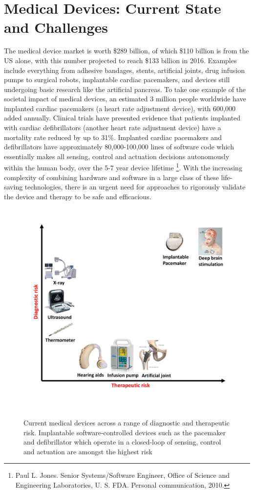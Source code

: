 \chapter{Medical Devices: Current State and Challenges}

The medical device market is worth \$289 billion, of which \$110 billion is from the US alone, with this number projected to reach \$133 billion in 2016.
Examples include everything from adhesive bandages, stents, artificial joints, drug infusion pumps to surgical robots, implantable cardiac pacemakers, and devices still undergoing basic research like the artificial pancreas.
To take one example of the societal impact of medical devices, an estimated 3 million people worldwide have implanted cardiac pacemakers (a heart rate adjustment device), with 600,000 added annually.
Clinical trials have presented evidence that patients implanted with cardiac defibrillators (another heart rate adjustment device) have a mortality rate reduced by up to 31\%.
Implanted cardiac pacemakers and defibrillators have approximately 80,000-100,000 lines of software code which essentially makes all sensing, control and actuation decisions autonomously within the human body, over the 5-7 year device lifetime \footnote{Paul L. Jones. Senior Systems/Software Engineer, Office of Science and Engineering
Laboratories, U. S. FDA. Personal communication, 2010.}. With the increasing complexity of combining hardware and software in a large class of these life-saving technologies, there is an urgent need for approaches to rigorously validate the device and therapy to be safe and efficacious.
\begin{figure}[t]
		\centering
		\includegraphics[width=\textwidth]{figs/devices_new.pdf}
		\caption{\small Current medical devices across a range of diagnostic and therapeutic risk. Implantable software-controlled devices such as the pacemaker and defibrillator which operate in a closed-loop of sensing, control and actuation are amongst the highest risk}
		\label{fig:Cur}
\end{figure}

